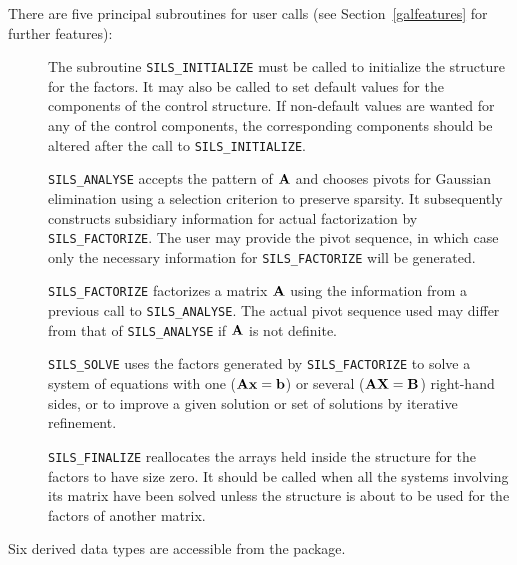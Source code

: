 \documentclass{galahad}
\newcommand{\packagename}{SILS}
\begin{document}
\noindent There are five principal subroutines for user calls (see 
Section~\ref{galfeatures} for further features): 
 
\begin{description} 
 
\item[] The subroutine {\tt \packagename\_INITIALIZE} must be called to 
initialize the 
structure for the factors. It may also be called to set default values 
for the components of the control structure. If non-default values are 
wanted for any of the control components, the corresponding components 
should be altered after the call to {\tt \packagename\_INITIALIZE}. 
  
\item[] {\tt \packagename\_ANALYSE} accepts the pattern of ${\mathbf{A}}$ 
 and chooses  pivots 
 for Gaussian elimination using a selection criterion to preserve 
 sparsity.  It subsequently constructs subsidiary information for 
 actual factorization by {\tt \packagename\_FACTORIZE}. The user may provide
 the pivot sequence, in which case only the necessary information for 
 {\tt \packagename\_FACTORIZE} will be generated. 
 
\item[] {\tt \packagename\_FACTORIZE} factorizes a matrix ${\mathbf{A}}$ using the 
information 
 from a previous call to {\tt \packagename\_ANALYSE}. The actual pivot sequence 
 used may differ from that of {\tt \packagename\_ANALYSE} if ${\mathbf{A}}$ is not 
definite. 
 
\item[] {\tt \packagename\_SOLVE} uses the factors generated by 
  {\tt \packagename\_FACTORIZE} to 
  solve a system of equations with one (${\mathbf{A}} {\mathbf{x}} = {\mathbf{b}}$) 
  or several (${\mathbf{A}} {\mathbf{X}} = {\mathbf{B}}$) right-hand sides, 
  or to improve a given solution or set of solutions 
  by iterative refinement. 
 
\item[] {\tt \packagename\_FINALIZE} reallocates the arrays held inside the  
  structure for the factors to have size zero. It should be called 
  when all the systems involving its matrix have been solved unless 
  the structure is about to be used for the factors of another matrix. 
  
\end{description} 



\galtypes
Six derived data types are accessible from the package.
\end{document}
